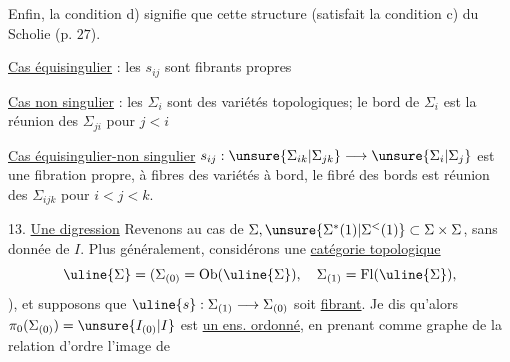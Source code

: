Enfin, la condition d) signifie que cette structure
(satisfait la condition c) du Scholie (p. $27$).

\uline{Cas équisingulier} : les $s_{ij}$ sont fibrants propres

\uline{Cas non singulier} : les $\Sigma_i$ sont des variétés
topologiques; le bord de $\Sigma_i$ est la réunion
des $\Sigma_{ji}$ pour $j<i$ 

\uline{Cas équisingulier-non singulier}
$s_{ij}:\unsure{\Sigma_{ik}|\Sigma_{jk}}\longrightarrow\unsure{\Sigma_i|\Sigma_j}$ est
une fibration propre, à fibres des variétés
à bord, le fibré des bords est réunion
des $\Sigma_{ijk}$ pour $i<j<k$.

13. \uline{Une digression} Revenons au cas de
$\Sigma,\unsure{\Sigma^{*}(1)|\Sigma^{<}(1)}\subset\Sigma\times\Sigma$, sans donnée de $I$. Plus
généralement, considérons une \uline{catégorie topologique}
\[
\uline{\Sigma}=(\Sigma_{(0)}=\operatorname{Ob}(\uline{\Sigma}),\quad\Sigma_{(1)}=\operatorname{Fl}(\uline{\Sigma}),
\]
), et supposons
que $\uline{s}:\Sigma_{(1)}\longrightarrow\Sigma_{(0)}$ soit \uline{fibrant}. Je dis
qu'alors $\pi_0(\Sigma_{(0)})=\unsure{I_{(0)}|I}$ est \uline{un ens. ordonné},
en prenant comme graphe de la relation
d'ordre l'image de
